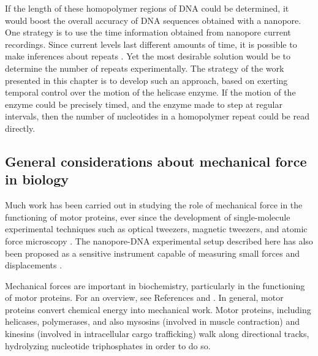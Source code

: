 If the length of these homopolymer regions of DNA could be determined, it would boost the overall accuracy of DNA sequences obtained with a nanopore.  One strategy is to use the time information obtained from nanopore current recordings.  Since current levels last different amounts of time, it is possible to make inferences about repeats \citep{Sarkozy2017}.  Yet the most desirable solution would be to determine the number of repeats experimentally.  The strategy of the work presented in this chapter is to develop such an approach, based on exerting temporal control over the motion of the helicase enzyme.  If the motion of the enzyme could be precisely timed, and the enzyme made to step at regular intervals, then the number of nucleotides in a homopolymer repeat could be read directly.

\subsection{General considerations about mechanical force in biology}

Much work has been carried out in studying the role of mechanical force in the functioning of motor proteins, ever since the development of single-molecule experimental techniques such as optical tweezers, magnetic tweezers, and atomic force microscopy \citep{Neuman2008}.  The nanopore-DNA experimental setup described here has also been proposed as a sensitive instrument capable of measuring small forces and displacements \citep{Derrington2015}.

Mechanical forces are important in biochemistry, particularly in the functioning of motor proteins.  For an overview, see References  and \citep{Oster2003}.  In general, motor proteins convert chemical energy into mechanical work.  Motor proteins, including helicases, polymerases, and also mysosins (involved in muscle contraction) and kinesins (involved in intracellular cargo trafficking) walk along directional tracks, hydrolyzing nucleotide triphosphates in order to do so.



